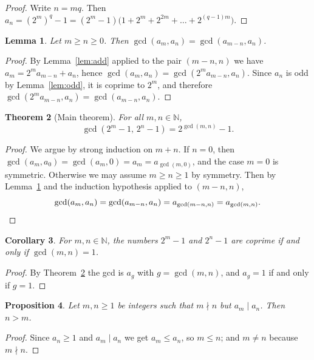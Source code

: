 \documentclass[11pt]{amsart}
\newtheorem{theorem}{Theorem}[section]
\newtheorem{lemma}[theorem]{Lemma}
\newtheorem{proposition}[theorem]{Proposition}
\newtheorem{corollary}[theorem]{Corollary}
\theoremstyle{definition}
\theoremstyle{remark}
\begin{document}
\begin{proof}
Write $n=mq$. Then
$a_n=(2^m)^q-1=(2^m-1)\bigl(1+2^m+2^{2m}+\dots+2^{(q-1)m}\bigr)$.
\end{proof}

\begin{lemma}\label{lem:step}
Let $m\ge n\ge 0$. Then $\gcd(a_m,a_n)=\gcd(a_{m-n},a_n)$.
\end{lemma}

\begin{proof}
By Lemma~\ref{lem:add} applied to the pair $(m-n,n)$ we have
$a_m=2^m a_{m-n}+a_n$, hence $\gcd(a_m,a_n)=\gcd(2^m a_{m-n},a_n)$. Since
$a_n$ is odd by Lemma~\ref{lem:odd}, it is coprime to $2^m$, and therefore
$\gcd(2^m a_{m-n},a_n)=\gcd(a_{m-n},a_n)$.
\end{proof}

\begin{theorem}[Main theorem]\label{thm:main}
For all $m,n\in\mathbb{N}$,
\[
  \gcd(2^m-1,\,2^n-1)=2^{\gcd(m,n)}-1 .
\]
\end{theorem}

\begin{proof}
We argue by strong induction on $m+n$. If $n=0$, then
$\gcd(a_m,a_0)=\gcd(a_m,0)=a_m=a_{\gcd(m,0)}$, and the case $m=0$ is symmetric.
Otherwise we may assume $m\ge n\ge 1$ by symmetry. Then by
Lemma~\ref{lem:step} and the induction hypothesis applied to $(m-n,n)$,
\[
  \gcd(a_m,a_n)=\gcd(a_{m-n},a_n)=a_{\gcd(m-n,n)}=a_{\gcd(m,n)} .\qedhere
\]
\end{proof}

\begin{corollary}\label{cor:coprime}
For $m,n\in\mathbb{N}$, the numbers $2^m-1$ and $2^n-1$ are coprime if and
only if $\gcd(m,n)=1$.
\end{corollary}

\begin{proof}
By Theorem~\ref{thm:main} the gcd is $a_g$ with $g=\gcd(m,n)$, and $a_g=1$ if
and only if $g=1$.
\end{proof}

\begin{proposition}\label{prop:vac}
Let $m,n\ge 1$ be integers such that $m\nmid n$ but $a_m\mid a_n$. Then
$n>m$.
\end{proposition}

\begin{proof}
Since $a_n\ge 1$ and $a_m\mid a_n$ we get $a_m\le a_n$, so $m\le n$; and
$m\ne n$ because $m\nmid n$.
\end{proof}
\end{document}
